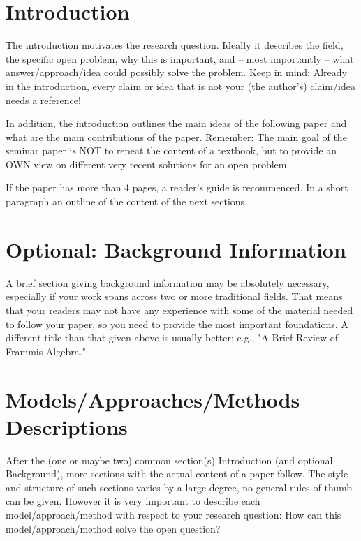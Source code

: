 \documentclass[12pt,twoside]{article}
\theoremstyle{plain}
\theoremstyle{definition}
\theoremstyle{remark}
\begin{document}


\section{Introduction}
\label{sec:introduction}

The introduction motivates the research question. Ideally it describes the field, the specific open problem, why this is important, and -- most importantly -- what answer/approach/idea could possibly solve the problem. Keep in mind: Already in the introduction, every claim or idea that is not your (the author's) claim/idea needs a reference!

In addition, the introduction outlines the main ideas of the following paper and what are the main contributions of the paper. Remember: The main goal of the seminar paper is NOT to repeat the content of a textbook, but to provide an OWN view on different very recent solutions for an open problem.

If the paper has more than 4 pages, a reader's guide is recommenced. In a short paragraph an outline of the content of the next sections.

\section{Optional: Background Information}
\label{sec:basics}
A brief section giving background information may be absolutely necessary, especially if your work spans across two or more traditional fields. That means that your readers may not have any experience with some of the material needed to follow your paper, so you need to provide the most important foundations. A different title than that given above is usually better; e.g., "A Brief Review of Frammis Algebra."


\section{Models/Approaches/Methods Descriptions}
\label{sec:model}

After the (one or maybe two) common section(s) Introduction (and optional Background), more sections with the actual content of a paper follow. The style and structure of such sections varies by a large degree, no general rules of thumb can be given. However it is very important to describe each model/approach/method with respect to your research question: How can this model/approach/method solve the open question? 
\end{document}
